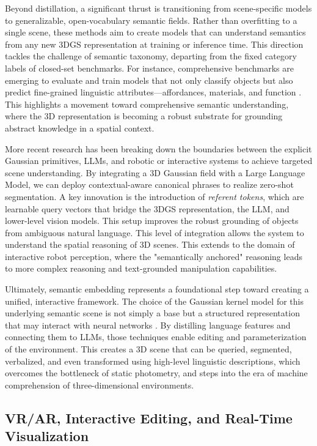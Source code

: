 \documentclass[11pt,a4paper]{article}
\begin{document}
Beyond distillation, a significant thrust is transitioning from scene-specific models to generalizable, open-vocabulary semantic fields. Rather than overfitting to a single scene, these methods aim to create models that can understand semantics from any new 3DGS representation at training or inference time. This direction tackles the challenge of semantic taxonomy, departing from the fixed category labels of closed-set benchmarks. For instance, comprehensive benchmarks are emerging to evaluate and train models that not only classify objects but also predict fine-grained linguistic attributes---affordances, materials, and function \cite{arxiv:2401.03890v2,arxiv:2403.11134v2}. This highlights a movement toward comprehensive semantic understanding, where the 3D representation is becoming a robust substrate for grounding abstract knowledge in a spatial context.

More recent research has been breaking down the boundaries between the explicit Gaussian primitives, LLMs, and robotic or interactive systems to achieve targeted scene understanding. By integrating a 3D Gaussian field with a Large Language Model, we can deploy contextual-aware canonical phrases to realize zero-shot segmentation. A key innovation is the introduction of \emph{referent tokens}, which are learnable query vectors that bridge the 3DGS representation, the LLM, and lower-level vision models. This setup improves the robust grounding of objects from ambiguous natural language. This level of integration allows the system to understand the spatial reasoning of 3D scenes. This extends to the domain of interactive robot perception, where the "semantically anchored" reasoning leads to more complex reasoning and text-grounded manipulation capabilities.

Ultimately, semantic embedding represents a foundational step toward creating a unified, interactive framework. The choice of the Gaussian kernel model for this underlying semantic scene is not simply a base but a structured representation that may interact with neural networks \cite{arxiv:2404.10772v1}. By distilling language features and connecting them to LLMs, those techniques enable editing and parameterization of the environment. This creates a 3D scene that can be queried, segmented, verbalized, and even transformed using high-level linguistic descriptions, which overcomes the bottleneck of static photometry, and steps into the era of machine comprehension of three-dimensional environments.


\subsection{VR/AR, Interactive Editing, and Real-Time Visualization}
\end{document}
